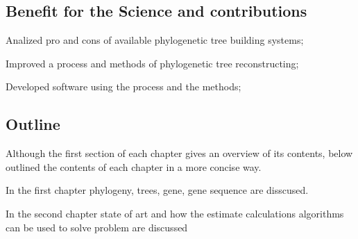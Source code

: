 \subsection*{Benefit for the Science and contributions}
Analized pro and cons of available phylogenetic tree building systems;

Improved a process and methods of phylogenetic tree reconstructing;

Developed software using the process and the methods;

\subsection*{Outline}
Although the first section of each chapter gives an overview of
its contents, below outlined the contents of each chapter in a more 
concise way.

In the first chapter phylogeny, trees, gene, gene sequence are disscused.

In the second chapter state of art and how the estimate calculations 
algorithms can be used to solve problem are discussed



